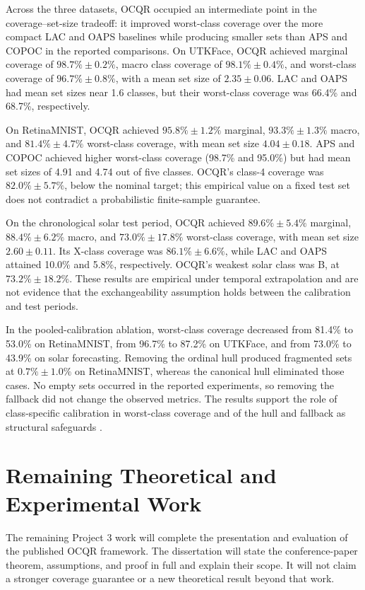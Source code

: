 \documentclass[12pt]{report}
\begin{document}
Across the three datasets, OCQR occupied an intermediate point in the coverage--set-size tradeoff: it improved worst-class coverage over the more compact LAC and OAPS baselines while producing smaller sets than APS and COPOC in the reported comparisons. On UTKFace, OCQR achieved marginal coverage of \(98.7\%\pm0.2\%\), macro class coverage of \(98.1\%\pm0.4\%\), and worst-class coverage of \(96.7\%\pm0.8\%\), with a mean set size of \(2.35\pm0.06\). LAC and OAPS had mean set sizes near 1.6 classes, but their worst-class coverage was 66.4\% and 68.7\%, respectively.

On RetinaMNIST, OCQR achieved \(95.8\%\pm1.2\%\) marginal, \(93.3\%\pm1.3\%\) macro, and \(81.4\%\pm4.7\%\) worst-class coverage, with mean set size \(4.04\pm0.18\). APS and COPOC achieved higher worst-class coverage (98.7\% and 95.0\%) but had mean set sizes of 4.91 and 4.74 out of five classes. OCQR's class-4 coverage was \(82.0\%\pm5.7\%\), below the nominal target; this empirical value on a fixed test set does not contradict a probabilistic finite-sample guarantee.

On the chronological solar test period, OCQR achieved \(89.6\%\pm5.4\%\) marginal, \(88.4\%\pm6.2\%\) macro, and \(73.0\%\pm17.8\%\) worst-class coverage, with mean set size \(2.60\pm0.11\). Its X-class coverage was \(86.1\%\pm6.6\%\), while LAC and OAPS attained 10.0\% and 5.8\%, respectively. OCQR's weakest solar class was B, at \(73.2\%\pm18.2\%\). These results are empirical under temporal extrapolation and are not evidence that the exchangeability assumption holds between the calibration and test periods.

In the pooled-calibration ablation, worst-class coverage decreased from 81.4\% to 53.0\% on RetinaMNIST, from 96.7\% to 87.2\% on UTKFace, and from 73.0\% to 43.9\% on solar forecasting. Removing the ordinal hull produced fragmented sets at \(0.7\%\pm1.0\%\) on RetinaMNIST, whereas the canonical hull eliminated those cases. No empty sets occurred in the reported experiments, so removing the fallback did not change the observed metrics. The results support the role of class-specific calibration in worst-class coverage and of the hull and fallback as structural safeguards \citep{hong2026ocqr}.

\section{Remaining Theoretical and Experimental Work}

The remaining Project 3 work will complete the presentation and evaluation of the published OCQR framework. The dissertation will state the conference-paper theorem, assumptions, and proof in full and explain their scope. It will not claim a stronger coverage guarantee or a new theoretical result beyond that work.
\end{document}
